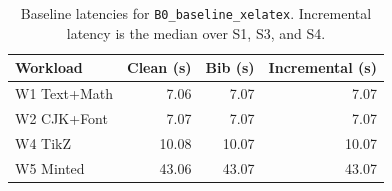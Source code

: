 \begin{table}[t]
\centering
\caption{Baseline latencies for \texttt{B0\_baseline\_xelatex}. Incremental latency is the median over S1, S3, and S4.}
\label{tab:baseline-rollup}
\begin{tabular}{lrrr}
\toprule
Workload & Clean (s) & Bib (s) & Incremental (s) \\
\midrule
W1 Text+Math & 7.06 & 7.07 & 7.07 \\
W2 CJK+Font & 7.07 & 7.07 & 7.07 \\
W4 TikZ & 10.08 & 10.07 & 10.07 \\
W5 Minted & 43.06 & 43.07 & 43.07 \\
\bottomrule
\end{tabular}
\end{table}

